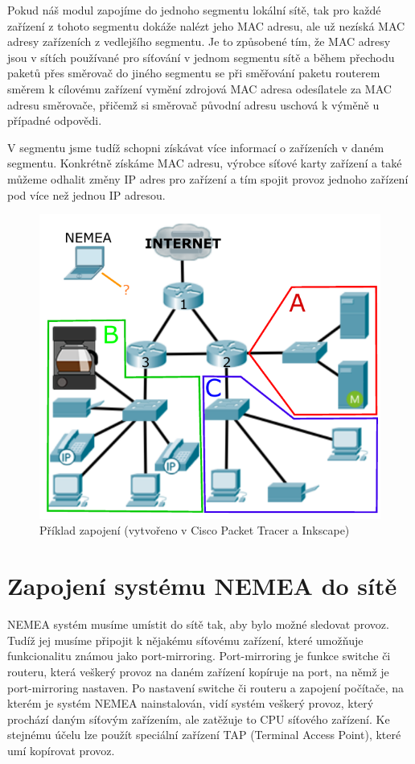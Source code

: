 \documentclass[thesis=B,czech,hidelinks]{FITthesis}[2019/03/21]
\begin{document}
    Pokud náš modul zapojíme do jednoho segmentu lokální sítě, tak pro každé zařízení z tohoto segmentu dokáže nalézt jeho MAC adresu, ale už nezíská MAC adresy zařízeních z vedlejšího segmentu. Je to způsobené tím, že MAC adresy jsou v sítích používané pro síťování v jednom segmentu sítě a během přechodu paketů přes směrovač do jiného segmentu se při směřování paketu routerem směrem k cílovému zařízení vymění zdrojová MAC adresa odesílatele za MAC adresu směrovače, přičemž si směrovač původní adresu uschová k výměně u případné odpovědi.
    
    V segmentu jsme tudíž schopni získávat více informací o zařízeních v daném segmentu. Konkrétně získáme MAC adresu, výrobce síťové karty zařízení a také můžeme odhalit změny IP adres pro zařízení a tím spojit provoz jednoho zařízení pod více než jednou IP adresou.
    
    \begin{figure}[h]
        \centering
        \includegraphics[scale=0.9]{Zapojeni.pdf}
        \caption[Příklad zapojení]{Příklad zapojení (vytvořeno v Cisco Packet Tracer a Inkscape)}
        \label{sit}
    \end{figure}
    
    \section{Zapojení systému NEMEA do sítě}
    NEMEA systém musíme umístit do sítě tak, aby bylo možné sledovat provoz. Tudíž jej musíme připojit k nějakému síťovému zařízení, které umožňuje funkcionalitu známou jako port-mirroring. Port-mirroring je funkce switche či routeru, která veškerý provoz na daném zařízení kopíruje na port, na němž je port-mirroring nastaven. Po nastavení switche či routeru a zapojení počítače, na kterém je systém NEMEA nainstalován, vidí systém veškerý provoz, který prochází daným síťovým zařízením, ale zatěžuje to CPU síťového zařízení. Ke stejnému účelu lze použít speciální zařízení TAP (Terminal Access Point), které umí kopírovat provoz.
    
\end{document}
